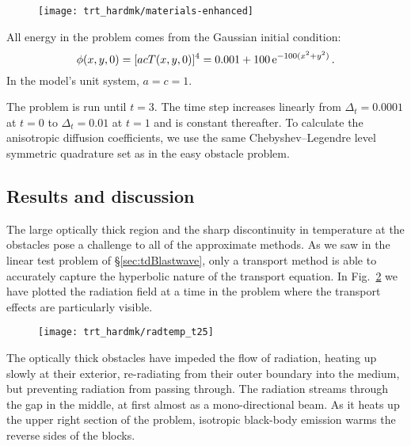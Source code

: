 \begin{figure}[htb]
  \centering
  \texttt{[image: trt\_hardmk/materials-enhanced]}
  \label{fig:hardmkMaterials}
\end{figure}

All energy in the problem comes from the Gaussian initial condition:
\begin{equation*}
  \phi(x,y,0) = [ a c T(x,y,0)]^{4} = 0.001 + 100 \mathop{}\!\mathrm{e}^{-100 (x^2 + y^2) } \,.
\end{equation*}
In the model's unit system, $a=c=1$.

The problem is run until $t=3$. The time step increases linearly from
$\Delta_t=0.0001$ at
$t=0$ to $\Delta_t=0.01$ at $t=1$ and is constant thereafter. To calculate the
anisotropic diffusion coefficients, we use the same Chebyshev--Legendre level
symmetric quadrature set as in the easy obstacle problem.

\subsection{Results and discussion}

The large optically thick region and the sharp discontinuity in temperature at
the obstacles pose a challenge to all of the approximate methods. As we saw in
the linear test problem of \S\ref{sec:tdBlastwave}, only a transport method is
able to accurately capture the hyperbolic nature of the transport equation. In
Fig.~\ref{fig:hardmkPseudocolor} we have plotted the radiation field at a time
in the problem where the transport effects are particularly visible.
%
\begin{figure}[htb]
  \centering
  \hspace{-1in}%
  \texttt{[image: trt\_hardmk/radtemp\_t25]}
  \label{fig:hardmkPseudocolor}
\end{figure}
%
The optically thick obstacles have impeded the flow of radiation, heating up
slowly at their exterior, re-radiating from their outer boundary into the
medium, but preventing radiation from passing through. The radiation streams
through the gap in the middle, at first almost as a mono-directional beam. As it
heats up the upper right section of the problem, isotropic black-body emission
warms the reverse sides of the blocks.

